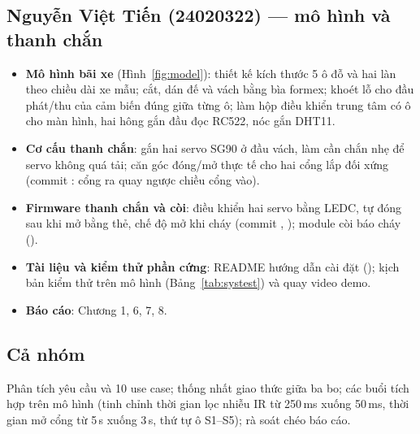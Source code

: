 \subsection{Nguyễn Việt Tiến (24020322) — mô hình và thanh chắn}
\begin{itemize}
  \item \textbf{Mô hình bãi xe} (Hình~\ref{fig:model}): thiết kế kích thước 5 ô đỗ và hai
        làn theo chiều dài xe mẫu; cắt, dán đế và vách bằng bìa formex; khoét lỗ cho đầu
        phát/thu của cảm biến đúng giữa từng ô; làm hộp điều khiển trung tâm có ô cho màn
        hình, hai hông gắn đầu đọc RC522, nóc gắn DHT11.
  \item \textbf{Cơ cấu thanh chắn}: gắn hai servo SG90 ở đầu vách, làm cần chắn nhẹ để
        servo không quá tải; căn góc đóng/mở thực tế cho hai cổng lắp đối xứng (commit
        : cổng ra quay ngược chiều cổng vào).
  \item \textbf{Firmware thanh chắn và còi}: điều khiển hai servo bằng LEDC, tự đóng sau
        khi mở bằng thẻ, chế độ mở khi cháy (commit , ); module còi báo cháy
        ().
  \item \textbf{Tài liệu và kiểm thử phần cứng}: README hướng dẫn cài đặt
        (); kịch bản kiểm thử trên mô hình
        (Bảng~\ref{tab:systest}) và quay video demo.
  \item \textbf{Báo cáo}: Chương 1, 6, 7, 8.
\end{itemize}

\subsection{Cả nhóm}
Phân tích yêu cầu và 10 use case; thống nhất giao thức giữa ba bo; các buổi tích hợp
trên mô hình (tinh chỉnh thời gian lọc nhiễu IR từ 250\,ms xuống 50\,ms, thời gian mở
cổng từ 5\,s xuống 3\,s, thứ tự ô S1–S5); rà soát chéo báo cáo.

